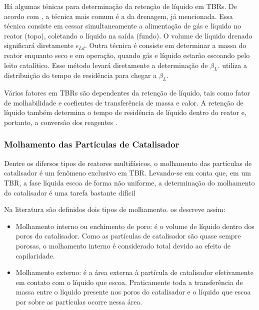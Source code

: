 Há algumas ténicas para determinação da retenção de líquido em TBRs. De acordo
com \cite{Benkrid1997}, a técnica mais comum é a da drenagem, já mencionada.
Essa técnica consiste em cessar simultaneamente a alimentação de gás e líquido
no reator (topo), coletando o líquido na saída (fundo). O volume de líquido
drenado significará diretamente $\epsilon_{Ld}$. Outra técnica é consiste em
determinar a massa do reator enquanto seco e em operação, quando gás e líquido
estarão escoando pelo leito catalítico. Esse método levará diretamente a
determinação de $\beta_L$. \cite{Larachi1991} utiliza a distribuição do tempo de
residência para chegar a $\beta_L$.

Vários fatores em TBRs são dependentes da retenção de líquido, tais como fator
de molhabilidade e coefientes de transferência de massa e calor. A retenção de
líquido também determina o tempo de residência de líquido dentro do reator e,
portanto, a conversão dos reagentes \cite{Ranade2011}.


\subsubsection{Molhamento das Partículas de Catalisador}
\label{sec:molhamento}

Dentre os difersos tipos de reatores multifásicos, o molhamento das partículas
de catalisador é um fenômeno exclusivo em TBR. Levando-se em conta que, em um
TBR, a fase líquida escoa de forma não uniforme, a determinação do molhamento do
catalisador é uma tarefa bastante difícil \cite{Ranade2011}

Na literatura são definidos dois tipos de molhamento. 
os descreve assim:

\begin{itemize}
	\item Molhamento interno ou enchimento de poro: é o volume de líquido dentro
	dos poros do catalisador. Como as partículas de catalisador são quase sempre
	porosas, o molhamento interno é considerado total devido ao efeito de
	capilaridade.
	\item Molhamento externo: é a área externa à partícula de catalisador
	efetivamente em contato com o líquido que escoa. Praticamente toda a
	transferência de massa entre o líquido presente nos poros do catalisador e o
	líquido que escoa por sobre as partículas ocorre nessa área.
\end{itemize}

